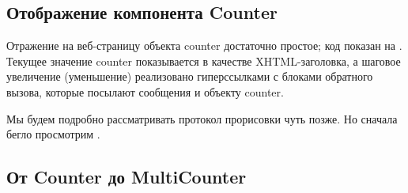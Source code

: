 \documentclass[a4paper,10pt,twoside]{book}
\begin{document}
\subsection{Отображение компонента Counter}


Отражение на веб-страницу объекта counter достаточно простое; код показан на .
Текущее значение counter показывается в качестве XHTML-заголовка,
а шаговое увеличение (уменьшение) реализовано гиперссылками с
блоками обратного вызова,
которые посылают сообщения  и  объекту counter.


Мы будем подробно рассматривать протокол прорисовки чуть позже.
Но сначала бегло просмотрим .


\subsection{От Counter до MultiCounter}

\end{document}

